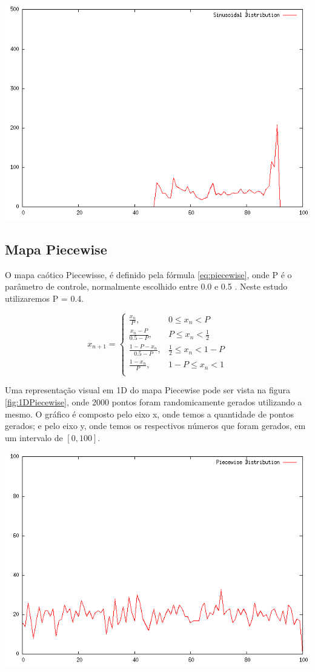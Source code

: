{
    \centering
    \includegraphics[width=0.6\linewidth]{figuras/DistribuicaoSinusoidal.png}
    \label{fig:1DSinusoidal}
}

\subsection{Mapa Piecewise}

O mapa caótico Piecewisse, é definido pela fórmula \ref{eq:piecewise}, onde P é o parâmetro de controle, normalmente escolhido entre 0.0 e 0.5 \cite{gandomi}. Neste estudo utilizaremos P = 0.4.

\begin{equation}
\label{eq:piecewise}
x_{n + 1} =
\begin{cases}
    \frac{x_{n}}{P}, & \text{$0 \leq x_{n} < P$}\\
    \frac{x_{n} - P}{0.5 - P}, & \text{$P \leq x_{n} < \frac{1}{2}$}\\
    \frac{1-P-x_{n}}{0.5 - P}, & \text{$\frac{1}{2} \leq x_{n} < 1-P $}\\
    \frac{1-x_{n}}{P}, & \text{$1-P \leq x_{n} < 1$}\\
\end{cases}
\end{equation}

Uma representação visual em 1D do mapa Piecewise pode ser vista na figura \ref{fig:1DPiecewise}, onde 2000 pontos foram randomicamente gerados utilizando a mesmo. O gráfico é composto pelo eixo x, onde temos a quantidade de pontos gerados; e pelo eixo y, onde temos os respectivos números que foram gerados, em um intervalo de $[0, 100]$.

{
    \centering
    \includegraphics[width=0.6\linewidth]{figuras/DistribuicaoPiecewise.png}
    \label{fig:1DPiecewise}
}

